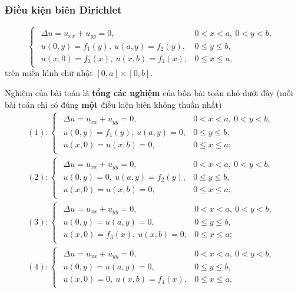 \documentclass[10pt, a4paper]{article}
\begin{document}
	\subsubsection{Điều kiện biên Dirichlet}
	\vspace{2mm}
	\begin{tcolorbox}[enhanced,colback=blue!5!white,colframe=blue!75!black,sharp corners=all,shadow={0mm}{0mm}{-1.5mm}%
		{fill=blue!75!red,opacity=0.3},title=\textbf{Dạng tổng quát của bài toán}]
		$$\begin{cases}
			\begin{array}{ll}
				\Delta u=u_{xx}+u_{yy}=0, & 0<x<a,~0<y<b,\\
				u(0,y)=f_1(y),~u(a,y)=f_2(y), & 0\le y\le b,\\
				u(x,0)=f_3(x),~u(x,b)=f_4(x), & 0\le x\le a,
			\end{array}
		\end{cases}$$
		trên miền hình chữ nhật $[0,a]\times[0,b]$.
	\end{tcolorbox}
	\vspace{2mm}
	Nghiệm của bài toán là \textbf{tổng các nghiệm} của bốn bài toán nhỏ dưới đây (mỗi bài toán chỉ có đúng \textbf{một} điều kiện biên không thuần nhất) \begin{gather*}
		(1)\colon\begin{cases}
			\begin{array}{ll}
				\Delta u=u_{xx}+u_{yy}=0, & 0<x<a,~0<y<b,\\
				u(0,y)=f_1(y),~u(a,y)=0, & 0\le y\le b,\\
				u(x,0)=u(x,b)=0, & 0\le x\le a;
			\end{array}
		\end{cases}\\
		(2)\colon\begin{cases}
			\begin{array}{ll}
				\Delta u=u_{xx}+u_{yy}=0, & 0<x<a,~0<y<b,\\
				u(0,y)=0,~u(a,y)=f_2(y), & 0\le y\le b,\\
				u(x,0)=u(x,b)=0, & 0\le x\le a;
			\end{array}
		\end{cases}\\
		(3)\colon\begin{cases}
			\begin{array}{ll}
				\Delta u=u_{xx}+u_{yy}=0, & 0<x<a,~0<y<b,\\
				u(0,y)=u(a,y)=0, & 0\le y\le b,\\
				u(x,0)=f_3(x),~u(x,b)=0, & 0\le x\le a;
			\end{array}
		\end{cases}\\
		(4)\colon\begin{cases}
			\begin{array}{ll}
				\Delta u=u_{xx}+u_{yy}=0, & 0<x<a,~0<y<b,\\
				u(0,y)=u(a,y)=0, & 0\le y\le b,\\
				u(x,0)=0,~u(x,b)=f_4(x), & 0\le x\le a.
			\end{array}
		\end{cases}
	\end{gather*}
	
\end{document}
